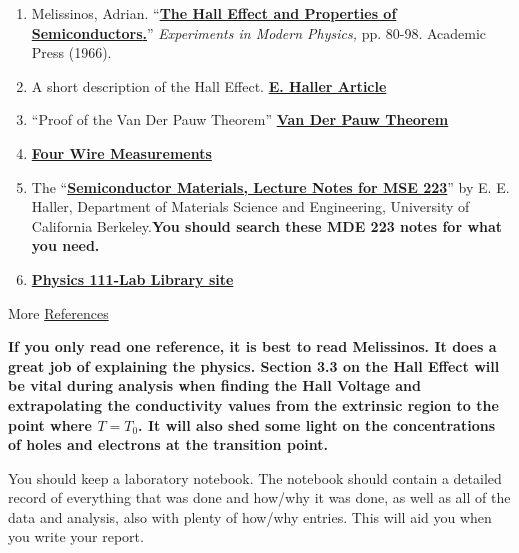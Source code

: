 \documentclass{../lab}
\begin{document}
\begin{enumerate}
    \item Melissinos, Adrian. ``\href{http://physics111.lib.berkeley.edu/Physics111/Reprints/SHE/SHE\_Melissinos\_properties\_of\_semiconductors\_pg\_80-98\_1966.pdf}{\textbf{\textbf{The Hall Effect and Properties of Semiconductors}.}}'' \emph{Experiments in Modern Physics,} pp. 80-98. Academic Press (1966).

    \item A short description of the Hall Effect. \href{http://physics111.lib.berkeley.edu/Physics111/Reprints/SHE/24-Haller.pdf}{\textbf{E. Haller Article}}

    \item ``Proof of the Van Der Pauw Theorem'' \href{http://experimentationlab.berkeley.edu/node/105}{\textbf{\textbf{Van Der Pauw Theorem}}}

    \item \href{http://physics111.lib.berkeley.edu/Physics111/Reprints/SHE/19-Four\_Wire\_Measurement.pdf}{\textbf{Four Wire Measurements}}

    \item The ``\href{http://physics111.lib.berkeley.edu/Physics111/Reprints/SHE/Semiconductor\%20Materials\%20Notes\%20MSE\%20223\%20Haller.pdf}{\textbf{Semiconductor Materials, Lecture Notes for MSE 223}}'' by E. E. Haller, Department of Materials Science and Engineering, University of California Berkeley.\textbf{You should search these MDE 223 notes for what you need.}

    \item \href{\LabReprints}{\textbf{\textbf{Physics 111-Lab Library site}}}

\end{enumerate}

More \hyperref[sec:References]{References}

\textbf{If you only read one reference, it is best to read Melissinos. It does a great job of explaining the physics. Section 3.3 on the Hall Effect will be vital during analysis when finding the Hall Voltage and extrapolating the conductivity values from the extrinsic region to the point where $T = T_{0}$. It will also shed some light on the concentrations of holes and electrons at the transition point.}

You should keep a laboratory notebook. The notebook should contain a detailed record of everything that was done and how/why it was done, as well as all of the data and analysis, also with plenty of how/why entries. This will aid you when you write your report.
\end{document}
